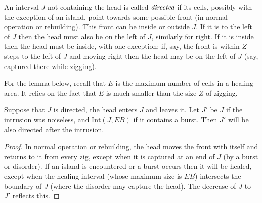 \documentclass[11pt]{memoir}
\theoremstyle{definition} %
\def\B{B}
\newcommand{\E}{E}
\newcommand{\Int}{\mathrm{Int}}
\newcommand{\Z}{Z}
\begin{document}
\begin{definition}
  An interval \( J \) not containing the head is called \( \emph{directed} \) if
  its cells, possibly with the exception of an island, point towards some possible front (in normal operation
  or rebuilding).
  This front can be inside or outside \( J \).
  If it is to the left of \( J \) then the head must also be on the left of \( J \), similarly for right.
  If it is inside then the head must be inside, with one exception: if, say, the front is within \( Z \) steps
  to the left of \( J \) and moving right then the head may be on the left of \( J \) (say, captured there while
  zigging).
  \end{definition}

  For the lemma below, recall that \( \E \) is the maximum number of cells in a healing area.
It relies on the fact that \( \E \) is much smaller than the size \( \Z \) of zigging.

  \begin{lemma}\label{lem:keep-directed}
  Suppose that \( J \) is directed, the head enters \( J \) and leaves it.
  Let \( J' \) be \( J \) if the intrusion was noiseless, and \( \Int(J,\E\B) \) if it contains a burst.
  Then \( J' \) will be also directed after the intrusion.
\end{lemma}
\begin{proof}
  In normal operation or rebuilding,
  the head moves the front with itself and returns to it from every zig, except when it is
  captured at an end of \( J \) (by a burst or disorder).
  If an island is encountered or a burst occurs then it will be healed, except when the healing interval
  (whose maximum size is \( \E\B \)) intersects
  the boundary of \( J \) (where the disorder may capture the head).
  The decrease of \( J \) to \( J' \) reflects this.
\end{proof}
\end{document}
